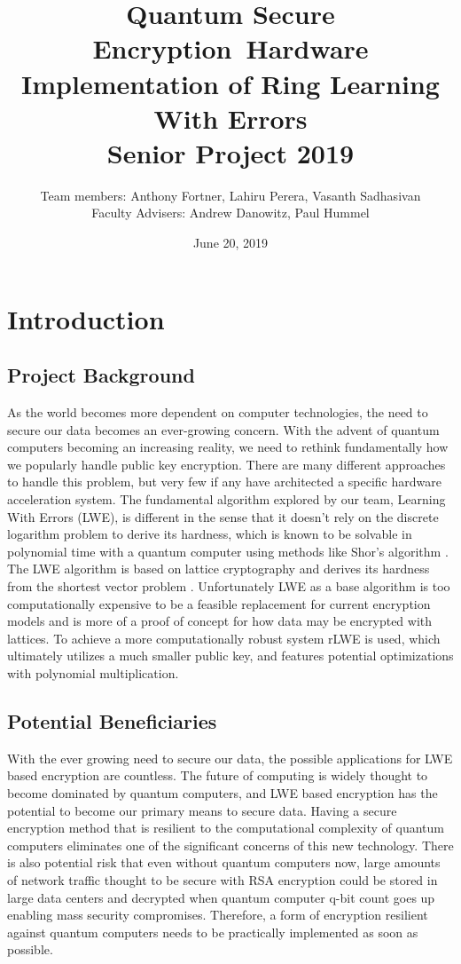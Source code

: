 \documentclass{article}
\title{Quantum Secure Encryption\ Hardware Implementation of Ring Learning With Errors\\ Senior Project 2019}
\date{June 20, 2019}
\author{Team members: Anthony Fortner, Lahiru Perera, Vasanth Sadhasivan \\ Faculty Advisers: Andrew Danowitz, Paul Hummel}
\begin{document}
\maketitle
\newpage
{}
  
\tableofcontents
\newpage

\section{Introduction}
\subsection{Project Background}
As the world becomes more dependent on computer technologies, the need to secure our data becomes an ever-growing concern. With the advent of quantum computers becoming an increasing reality, we need to rethink fundamentally how we popularly handle public key encryption. There are many different approaches to handle this problem, but very few if any have architected a specific hardware acceleration system. The fundamental algorithm explored by our team, Learning With Errors (LWE), is different in the sense that it doesn’t rely on the discrete logarithm problem to derive its hardness, which is known to be solvable in polynomial time with a quantum computer using methods like Shor’s algorithm \cite{cryptoeprint:2014:725}. The LWE algorithm is based on lattice cryptography and derives its hardness from the shortest vector problem \cite{Regev:2005:LLE:1060590.1060603}. Unfortunately LWE as a base algorithm is too computationally expensive to be a feasible replacement for current encryption models and is more of a proof of concept for how data may be encrypted with lattices. To achieve a more computationally robust system rLWE is used, which ultimately utilizes a much smaller public key, and features potential optimizations with polynomial multiplication. 

\subsection{Potential Beneficiaries}
With the ever growing need to secure our data, the possible applications for LWE based encryption are countless. The future of computing is widely thought to become dominated by quantum computers, and LWE based encryption has the potential to become our primary means to secure data. Having a secure encryption method that is resilient to the computational complexity of quantum computers eliminates one of the significant concerns of this new technology. There is also potential risk that even without quantum computers now, large amounts of network traffic thought to be secure with RSA encryption could be stored in large data centers and decrypted when quantum computer q-bit count goes up enabling mass security compromises. Therefore, a form of encryption resilient against quantum computers needs to be practically implemented as soon as possible. 
\end{document}

